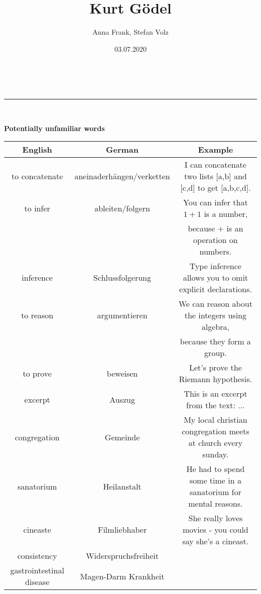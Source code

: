 \documentclass[a4paper,11pt]{article}
\makeatletter
\newcommand{\linia}{\rule{\linewidth}{0.5pt}}
\theoremstyle{mytheor}
\renewcommand{\maketitle}{
\begin{center}
\vspace{2ex}
{\huge \textsc{\@title}}
\vspace{1ex}
\\
\linia\\
\@author \hfill \@date
\vspace{4ex}
\end{center}
}
\makeatother
\begin{document}
\title{Kurt Gödel\\\Large{}}

\author{Anna Frank, Stefan Volz}

\date{03.07.2020}

\maketitle

\begin{center}
    \textbf{Potentially unfamiliar words}\\
    \begin{tabular}{c c c}
        English & German & Example \\
        \hline
        to concatenate & aneinaderhängen/verketten & I can concatenate two lists [a,b] and [c,d] to get [a,b,c,d]. \\
        to infer & ableiten/folgern & You can infer that $1+1$ is a number, \\
        &&because $+$ is an operation on numbers. \\
        inference & Schlussfolgerung  & Type inference allows you to omit explicit declarations.\\
        to reason & argumentieren & We can reason about the integers using algebra, \\
        & &  because they form a group. \\
        to prove & beweisen & Let's prove the Riemann hypothesis. \\
        excerpt & Auszug & This is an excerpt from the text: ... \\
        congregation & Gemeinde & My local christian congregation meets at church every sunday. \\
        sanatorium & Heilanstalt & He had to spend some time in a sanatorium for mental reasons. \\
        cineaste & Filmliebhaber & She really loves movies - you could say she's a cineast. \\
        consistency & Widerspruchsfreiheit & \\
        gastrointestinal disease & Magen-Darm Krankheit & \\
    \end{tabular}
\end{center}
\end{document}
